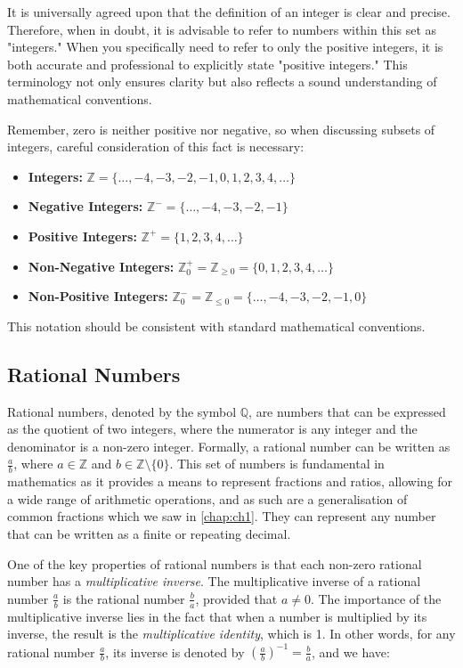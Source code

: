 It is universally agreed upon that the definition of an integer is clear and precise. Therefore, when in doubt, it is advisable to refer to numbers within this set as "integers." When you specifically need to refer to only the positive integers, it is both accurate and professional to explicitly state "positive integers." This terminology not only ensures clarity but also reflects a sound understanding of mathematical conventions. 

Remember, zero is neither positive nor negative, so when discussing subsets of integers, careful consideration of this fact is necessary:

\begin{itemize}
    \item \textbf{Integers:} $\mathbb{Z} = \{\ldots,-4,-3,-2,-1,0,1,2,3,4, \ldots\}$
    \item \textbf{Negative Integers:} $\mathbb{Z}^- = \{\ldots,-4,-3,-2,-1\}$
    \item \textbf{Positive Integers:} $\mathbb{Z}^+ = \{1,2,3,4, \ldots\}$
    \item \textbf{Non-Negative Integers:} $\mathbb{Z}_0^+ = \mathbb{Z}_{\geq 0} = \{0,1,2,3,4, \ldots\}$
    \item \textbf{Non-Positive Integers:} $\mathbb{Z}_0^- = \mathbb{Z}_{\leq 0} = \{\ldots,-4,-3,-2,-1, 0\}$
\end{itemize}

This notation should be consistent with standard mathematical conventions.

\subsection*{Rational Numbers}
Rational numbers, denoted by the symbol $\mathbb{Q}$, are numbers that can be expressed as the quotient of two integers, where the numerator is any integer and the denominator is a non-zero integer. Formally, a rational number can be written as $\frac{a}{b}$, where $a \in \mathbb{Z}$ and $b \in \mathbb{Z} \setminus \{0\}$. This set of numbers is fundamental in mathematics as it provides a means to represent fractions and ratios, allowing for a wide range of arithmetic operations, and as such are a generalisation of common fractions which we saw in \autoref{chap:ch1}. They can represent any number that can be written as a finite or repeating decimal.

One of the key properties of rational numbers is that each non-zero rational number has a \textit{multiplicative inverse}. The multiplicative inverse of a rational number $\frac{a}{b}$ is the rational number $\frac{b}{a}$, provided that $a \neq 0$. The importance of the multiplicative inverse lies in the fact that when a number is multiplied by its inverse, the result is the \textit{multiplicative identity}, which is 1. In other words, for any rational number $\frac{a}{b}$, its inverse is denoted by $\left(\frac{a}{b}\right)^{-1} = \frac{b}{a}$, and we have:

